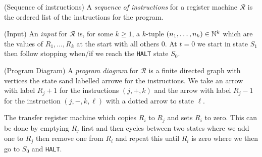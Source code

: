 \documentclass[tikx, border = 10pt]{article}
\begin{document}
\begin{definition}
(Sequence of instructions) A \textit{sequence of instructions} for a register machine $ \mathcal R $ is the ordered list of the instructions for the program.
\end{definition}
\begin{definition}
	(Input) An \textit{input} for $ \mathcal R $ is, for some $ k \ge 1 $, a $ k $-tuple $ (n_1,\dots, n_k) \in \mathbb{N}^k $ which are the values of $ R_1,\dots, R_k $ at the start with all others $ 0 $. At $ t=0 $ we start in state $ S_1 $ then follow stopping when/if we reach the \verb-HALT- state $ S_0 $.
\end{definition}
\begin{definition}
	(Program Diagram) A \textit{program diagram} for $ \mathcal R $ is a finite directed graph with vertices the state sand labelled arrowe for the instructions. We take an arrow with label $ R_j+1 $ for the instructions $ (j,+,k) $ and the arrow with label $ R_j - 1 $ for the instruction $ (j,-,k,\ell) $ with a dotted arrow to state $ \ell $.
\end{definition}

\begin{example}
  The transfer register machine which copies $ R_i $ to $ R_j $ and sets $ R_i $ to zero. This can be done by emptying $ R_j $ first and then cycles between two states where we add one to $ R_j $ then remove one from $ R_i $ and repeat this until $ R_i $ is zero where we then go to $ S_0 $ and \verb-HALT-.
\end{example}
\end{document}
